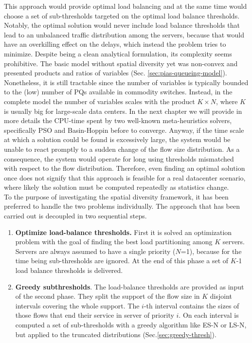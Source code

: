 This approach would provide optimal load balancing and at the same time would choose a set of sub-thresholds targeted on the optimal load balance thresholds. Notably, the optimal solution would never include load balance thresholds that lead to an unbalanced traffic distribution among the servers, because that would have an overkilling effect on the delays, which instead the problem tries to minimize. Despite being a clean analytical formulation, its complexity seems prohibitive. The basic model without spatial diversity yet was non-convex and presented products and ratios of variables (Sec. \ref{sec:pias-queueing-model}). Nonetheless, it is still tractable since the number of variables is typically bounded to the (low) number of PQs available in commodity switches. Instead, in the complete model the number of variables scales with the product $K \times N$, where $K$ is usually big for large-scale data centers. In the next chapter we will provide in more details the CPU-time spent by two well-known meta-heuristics solvers, specifically PSO \cite{pso,pso2} and Basin-Hoppin \cite{basinhoppin} before to converge. Anyway, if the time scale at which a solution could be found is excessively large, the system would be unable to react promptly to a sudden change of the flow size distribution. As a consequence, the system would operate for long using thresholds mismatched with respect to the flow distribution. Therefore, even finding an optimal solution once does not signify that this approach is feasible for a real datacenter scenario, where likely the solution must be computed repeatedly as statistics change. \\
To the purpose of investigating the spatial diversity framework, it has been preferred to handle the two problems individually. The approach that has been carried out is decoupled in two sequential steps.
\begin{enumerate}
	\item \textbf{Optimize load-balance thresholds.} First it is solved an optimization problem with the goal of finding the best load partitioning among $K$ servers. Servers are always assumed to have a single priority ($N$=1), because for the time being sub-thresholds are ignored. At the end of this phase a set of $K$-1 load balance thresholds is delivered.
	\item \textbf{Greedy subthresholds}. The load-balance thresholds are provided as input of the second phase. They split the support of the flow size in $K$ disjoint intervals covering the whole support. The $i$-th interval contains the sizes of those flows that end their service in server of priority $i$. On each interval is computed a set of sub-thresholds with a greedy algorithm like ES-N or LS-N, but applied to the truncated distributions (Sec.\ref{sec:greedy-thresh}).  
\end{enumerate}

